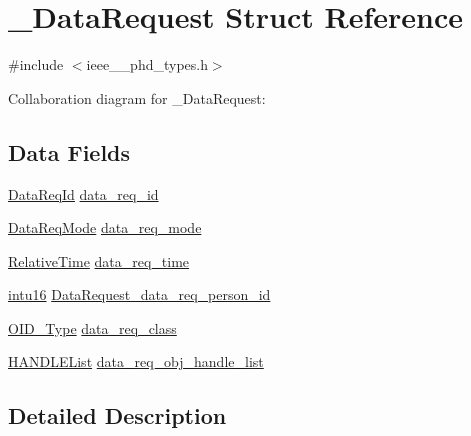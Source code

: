 \hypertarget{struct___data_request}{}\section{\+\_\+\+Data\+Request Struct Reference}
\label{struct___data_request}


{\ttfamily \#include $<$ieee\+\_\+\_\+phd\+\_\+types.\+h$>$}



Collaboration diagram for \+\_\+\+Data\+Request\+:
\subsection*{Data Fields}
\begin{DoxyCompactItemize}
\item 
\hyperlink{ieee__11073__phd__types_8h_ab2d118926c6a08395e5d075382450ae0}{Data\+Req\+Id} \hyperlink{struct___data_request_a1c786af4096ed61c5f6cfdf27f317b70}{data\+\_\+req\+\_\+id}
\item 
\hyperlink{ieee__11073__phd__types_8h_a67ece8901b30cdaafaebedb31a5d7ea7}{Data\+Req\+Mode} \hyperlink{struct___data_request_aad6b7d207038ee232636dfe697e6027f}{data\+\_\+req\+\_\+mode}
\item 
\hyperlink{ieee__11073__phd__types_8h_a396922eed4599fd81cd463e5c941eb03}{Relative\+Time} \hyperlink{struct___data_request_a9eb6d0abd225e3b10c07461a6defebb3}{data\+\_\+req\+\_\+time}
\item 
\hyperlink{ieee__11073__phd__types_8h_a3561595d2aa7416532e1c9910abd076d}{intu16} \hyperlink{struct___data_request_a4eb9677e2a7609d240edeeab6c643b73}{Data\+Request\+\_\+data\+\_\+req\+\_\+person\+\_\+id}
\item 
\hyperlink{ieee__11073__phd__types_8h_aa4d7af235d4a95d6632aa0d64160dd62}{O\+I\+D\+\_\+\+Type} \hyperlink{struct___data_request_a0337e79eff177bd5bdc454d9d86aff34}{data\+\_\+req\+\_\+class}
\item 
\hyperlink{ieee__11073__phd__types_8h_afcee828fb72469b70a7c8a47fbb09e5e}{H\+A\+N\+D\+L\+E\+List} \hyperlink{struct___data_request_a618e6c19f4f4ad8195774f4bd270d624}{data\+\_\+req\+\_\+obj\+\_\+handle\+\_\+list}
\end{DoxyCompactItemize}


\subsection{Detailed Description}


